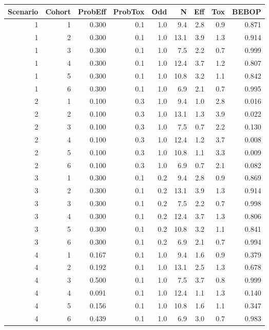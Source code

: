 \documentclass{article}
\begin{document}
\begin{table}[h!]
	\centering
	\begin{tabular}{rrrrrrrrr}
		\hline
		Scenario & Cohort & ProbEff & ProbTox & Odd & N & Eff & Tox & BEBOP \\ 
		\hline
		1 & 1 & 0.300 & 0.1 & 1.0 & 9.4 & 2.8 & 0.9 & 0.871 \\ 
		1 & 2 & 0.300 & 0.1 & 1.0 & 13.1 & 3.9 & 1.3 & 0.914 \\ 
		1 & 3 & 0.300 & 0.1 & 1.0 & 7.5 & 2.2 & 0.7 & 0.999 \\ 
		1 & 4 & 0.300 & 0.1 & 1.0 & 12.4 & 3.7 & 1.2 & 0.807 \\ 
		1 & 5 & 0.300 & 0.1 & 1.0 & 10.8 & 3.2 & 1.1 & 0.842 \\ 
		1 & 6 & 0.300 & 0.1 & 1.0 & 6.9 & 2.1 & 0.7 & 0.995 \\ 
		\hline
		2 & 1 & 0.100 & 0.3 & 1.0 & 9.4 & 1.0 & 2.8 & 0.016 \\ 
		2 & 2 & 0.100 & 0.3 & 1.0 & 13.1 & 1.3 & 3.9 & 0.022 \\ 
		2 & 3 & 0.100 & 0.3 & 1.0 & 7.5 & 0.7 & 2.2 & 0.130 \\ 
		2 & 4 & 0.100 & 0.3 & 1.0 & 12.4 & 1.2 & 3.7 & 0.008 \\ 
		2 & 5 & 0.100 & 0.3 & 1.0 & 10.8 & 1.1 & 3.3 & 0.009 \\ 
		2 & 6 & 0.100 & 0.3 & 1.0 & 6.9 & 0.7 & 2.1 & 0.082 \\ 
		\hline
		3 & 1 & 0.300 & 0.1 & 0.2 & 9.4 & 2.8 & 0.9 & 0.869 \\ 
		3 & 2 & 0.300 & 0.1 & 0.2 & 13.1 & 3.9 & 1.3 & 0.914 \\ 
		3 & 3 & 0.300 & 0.1 & 0.2 & 7.5 & 2.2 & 0.7 & 0.998 \\ 
		3 & 4 & 0.300 & 0.1 & 0.2 & 12.4 & 3.7 & 1.3 & 0.806 \\ 
		3 & 5 & 0.300 & 0.1 & 0.2 & 10.8 & 3.2 & 1.1 & 0.841 \\ 
		3 & 6 & 0.300 & 0.1 & 0.2 & 6.9 & 2.1 & 0.7 & 0.994 \\ 
		\hline
		4 & 1 & 0.167 & 0.1 & 1.0 & 9.4 & 1.6 & 0.9 & 0.379 \\ 
		4 & 2 & 0.192 & 0.1 & 1.0 & 13.1 & 2.5 & 1.3 & 0.678 \\ 
		4 & 3 & 0.500 & 0.1 & 1.0 & 7.5 & 3.7 & 0.8 & 0.999 \\ 
		4 & 4 & 0.091 & 0.1 & 1.0 & 12.4 & 1.1 & 1.3 & 0.140 \\ 
		4 & 5 & 0.156 & 0.1 & 1.0 & 10.8 & 1.6 & 1.1 & 0.347 \\ 
		4 & 6 & 0.439 & 0.1 & 1.0 & 6.9 & 3.0 & 0.7 & 0.983 \\ 

\end{tabular}
\end{table}
\end{document}
